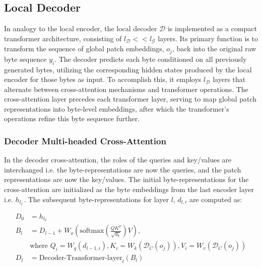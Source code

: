 \subsection{Local Decoder} 

In analogy to the local encoder, the local decoder $\mathcal{D}$ is implemented as a compact transformer architecture, consisting of $l_{\mathcal{D}} << l_{\mathcal{G}}$ layers. Its primary function is to transform the sequence of global patch embeddings, $o_j$, back into the original raw byte sequence $y_i$. The decoder predicts each byte conditioned on all previously generated bytes, utilizing the corresponding hidden states produced by the local encoder for those bytes as input. To accomplish this, it employs $l_{\mathcal{D}}$ layers that alternate between cross-attention mechanisms and transformer operations. The cross-attention layer precedes each transformer layer, serving to map global patch representations into byte-level embeddings, after which the transformer's operations refine this byte sequence further.

\subsubsection{Decoder Multi-headed Cross-Attention} 

In the decoder cross-attention, the roles of the queries and key/values are interchanged i.e. the byte-representations are now the queries, and the patch representations are now the key/values. The initial byte-representations for the cross-attention are initialized as the byte embeddings from the last encoder layer i.e. $h_{l_{\mathcal{E}}}$. The subsequent byte-representations for layer $l$, $d_{l,i}$ are computed as:

\begin{align}
D_0 &= h_{l_{\mathcal{E}}} \\
B_l &= D_{l-1} + W_o\left(\text{softmax}\left(\frac{QK^T}{\sqrt{d_k}}\right)V\right), \\
  &\text{where } Q_i = W_q(d_{l-1,i}), K_i = W_k(\mathcal{D}_C(o_j)), V_i = W_v(\mathcal{D}_C(o_j)) \\
  D_l &= \text{Decoder-Transformer-layer}_l(B_l)
\end{align}

